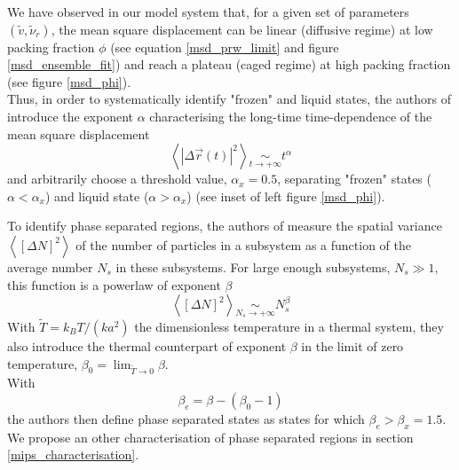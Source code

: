 \documentclass[class=report, float=false, crop=false]{standalone}
\begin{document}
We have observed in our model system that, for a given set of parameters $(\tilde{v}, \tilde{\nu}_r)$, the mean square displacement can be linear (diffusive regime) at low packing fraction $\phi$ (see equation \ref{msd_prw_limit} and figure \ref{msd_ensemble_fit}) and reach a plateau (caged regime) at high packing fraction (see figure \ref{msd_phi}).\\

Thus, in order to systematically identify "frozen" and liquid states, the authors of \cite{fily2014freezing} introduce the exponent $\alpha$ characterising the long-time time-dependence of the mean square displacement
\begin{equation}
\left<|\Delta\vec{r}(t)|^2\right> \underset{t \rightarrow +\infty}{\sim} t^{\alpha}
\label{exponent_alpha}
\end{equation}
and arbitrarily choose a threshold value, $\alpha_x = 0.5$, separating "frozen" states ($\alpha < \alpha_x$) and liquid state ($\alpha > \alpha_x$) (see inset of left figure \ref{msd_phi}).


To identify phase separated regions, the authors of \cite{fily2014freezing} measure the spatial variance $\left<[\Delta N]^2\right>$ of the number of particles in a subsystem as a function of the average number $N_s$ in these subsystems. For large enough subsystems, $N_s \gg 1$, this function is a powerlaw of exponent $\beta$
\begin{equation}
\left<[\Delta N]^2\right> \underset{N_s \rightarrow +\infty}{\sim} N_s^{\beta}
\label{exponent_beta}
\end{equation}
With $\tilde{T} = k_BT/(ka^2)$ the dimensionless temperature in a thermal system, they also introduce the thermal counterpart of exponent $\beta$ in the limit of zero temperature, $\beta_0 = \lim_{\tilde{T} \rightarrow 0} \beta$.\\

With
\begin{equation}
\beta_e = \beta - (\beta_0 - 1)
\label{exponent_betae}
\end{equation}
the authors then define phase separated states as states for which $\beta_e > \beta_x = 1.5$.\\

We propose an other characterisation of phase separated regions in section \ref{mips_characterisation}.

\end{document}
